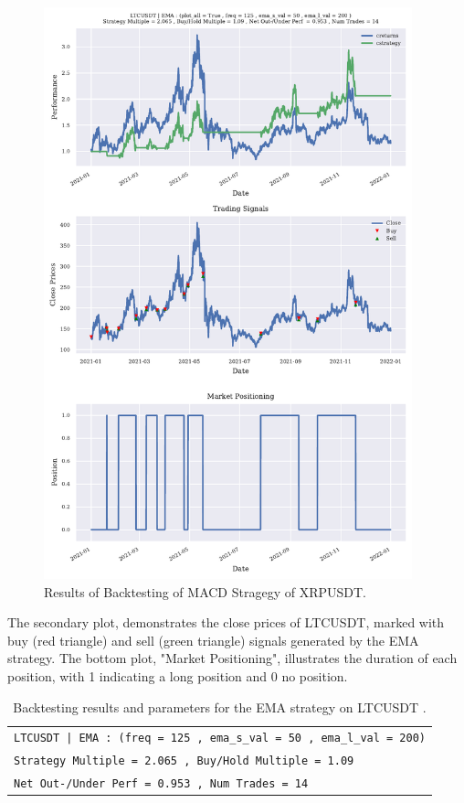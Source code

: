 \begin{figure} [H]
\centering
\includegraphics[page=1, trim=0mm 0mm 0 0mm, width=0.95\textwidth, clip]{./pdf/backtesting_results.pdf}
\caption{Results of Backtesting of MACD Stragegy of XRPUSDT.}
\label{fig:backtest_results}
\end{figure}

The secondary plot, demonstrates the close prices of LTCUSDT,
marked with buy (red triangle) and sell (green triangle) signals generated by the EMA strategy.
The bottom plot, "Market Positioning", illustrates the duration of each position, with 1 indicating a long position and 0 no position.

\begin{table}[H]
    \centering
    \begin{tabular}{l}
        \texttt{LTCUSDT | EMA : (freq = 125 , ema\_s\_val = 50 , ema\_l\_val = 200)} \\
        \texttt{Strategy Multiple = 2.065 , Buy/Hold Multiple = 1.09} \\
        \texttt{Net Out-/Under Perf = 0.953 , Num Trades = 14} \\
    \end{tabular}
    \caption{Backtesting results and parameters for the EMA strategy on LTCUSDT .}
    \label{tab:backtest_results}
\end{table}

